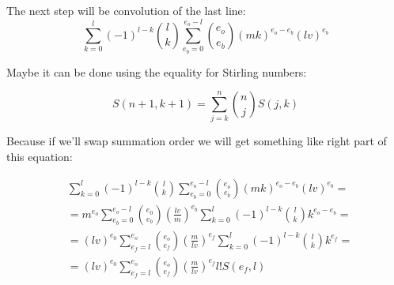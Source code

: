 \documentclass[a4paper]{article}
\begin{document}
The next step will be convolution of the last line:
$$ \sum_{k = 0}^{l} (-1)^{l - k} {l \choose k} \sum_{e_b = 0}^{e_o - l} {e_o \choose e_b} (mk)^{e_o - e_b} (lv)^{e_b}$$

Maybe it can be done using the equality for Stirling numbers:

$$S(n + 1, k + 1) = \sum_{j = k}^{n} {n \choose j} S(j, k)$$

Because if we'll swap summation order we will get something like right part of this equation:

\begin{align*}
& \sum_{k = 0}^{l} (-1)^{l - k} {l \choose k} \sum_{e_b = 0}^{e_o - l} {e_o \choose e_b} (mk)^{e_o - e_b} (lv)^{e_b} = \\
& = m^{e_o} \sum_{e_b = 0}^{e_o - l} {e_0 \choose e_b} \left(\frac{lv}{m}\right)^{e_b} \sum_{k = 0}^{l} (-1)^{l - k} {l \choose k} k^{e_o - e_b} = \\
& = (lv)^{e_0} \sum_{e_f = l}^{e_o} {e_o \choose e_f} \left(\frac{m}{lv}\right)^{e_f}\sum_{k = 0}^{l} (-1)^{l - k} {l \choose k} k^{e_f} = \\
& = (lv)^{e_0} \sum_{e_f = l}^{e_o} {e_o \choose e_f} \left(\frac{m}{lv}\right)^{e_f} l! S(e_f, l) 
\end{align*} 
\end{document}
